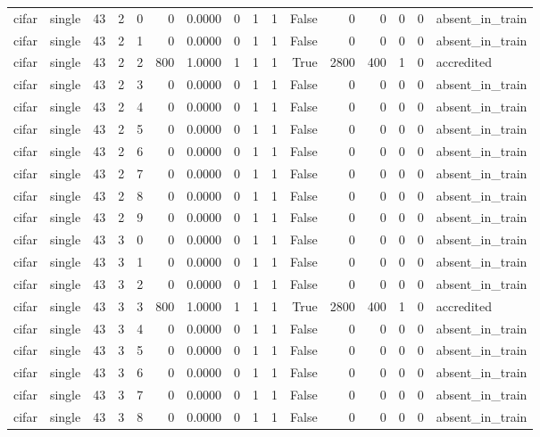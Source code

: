 \begin{tabular}{llrrrrrrrrrrrrrl}
cifar & single & 43 & 2 & 0 & 0 & 0.0000 & 0 & 1 & 1 & False & 0 & 0 & 0 & 0 & absent\_in\_train \\
cifar & single & 43 & 2 & 1 & 0 & 0.0000 & 0 & 1 & 1 & False & 0 & 0 & 0 & 0 & absent\_in\_train \\
cifar & single & 43 & 2 & 2 & 800 & 1.0000 & 1 & 1 & 1 & True & 2800 & 400 & 1 & 0 & accredited \\
cifar & single & 43 & 2 & 3 & 0 & 0.0000 & 0 & 1 & 1 & False & 0 & 0 & 0 & 0 & absent\_in\_train \\
cifar & single & 43 & 2 & 4 & 0 & 0.0000 & 0 & 1 & 1 & False & 0 & 0 & 0 & 0 & absent\_in\_train \\
cifar & single & 43 & 2 & 5 & 0 & 0.0000 & 0 & 1 & 1 & False & 0 & 0 & 0 & 0 & absent\_in\_train \\
cifar & single & 43 & 2 & 6 & 0 & 0.0000 & 0 & 1 & 1 & False & 0 & 0 & 0 & 0 & absent\_in\_train \\
cifar & single & 43 & 2 & 7 & 0 & 0.0000 & 0 & 1 & 1 & False & 0 & 0 & 0 & 0 & absent\_in\_train \\
cifar & single & 43 & 2 & 8 & 0 & 0.0000 & 0 & 1 & 1 & False & 0 & 0 & 0 & 0 & absent\_in\_train \\
cifar & single & 43 & 2 & 9 & 0 & 0.0000 & 0 & 1 & 1 & False & 0 & 0 & 0 & 0 & absent\_in\_train \\
cifar & single & 43 & 3 & 0 & 0 & 0.0000 & 0 & 1 & 1 & False & 0 & 0 & 0 & 0 & absent\_in\_train \\
cifar & single & 43 & 3 & 1 & 0 & 0.0000 & 0 & 1 & 1 & False & 0 & 0 & 0 & 0 & absent\_in\_train \\
cifar & single & 43 & 3 & 2 & 0 & 0.0000 & 0 & 1 & 1 & False & 0 & 0 & 0 & 0 & absent\_in\_train \\
cifar & single & 43 & 3 & 3 & 800 & 1.0000 & 1 & 1 & 1 & True & 2800 & 400 & 1 & 0 & accredited \\
cifar & single & 43 & 3 & 4 & 0 & 0.0000 & 0 & 1 & 1 & False & 0 & 0 & 0 & 0 & absent\_in\_train \\
cifar & single & 43 & 3 & 5 & 0 & 0.0000 & 0 & 1 & 1 & False & 0 & 0 & 0 & 0 & absent\_in\_train \\
cifar & single & 43 & 3 & 6 & 0 & 0.0000 & 0 & 1 & 1 & False & 0 & 0 & 0 & 0 & absent\_in\_train \\
cifar & single & 43 & 3 & 7 & 0 & 0.0000 & 0 & 1 & 1 & False & 0 & 0 & 0 & 0 & absent\_in\_train \\
cifar & single & 43 & 3 & 8 & 0 & 0.0000 & 0 & 1 & 1 & False & 0 & 0 & 0 & 0 & absent\_in\_train \\

\end{tabular}
